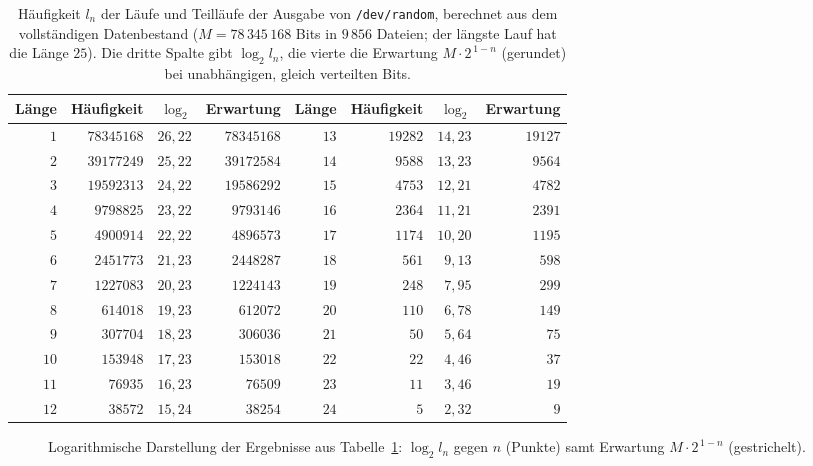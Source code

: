 \documentclass[11pt,a4paper]{scrartcl}
\theoremstyle{plain}
\theoremstyle{definition}
\theoremstyle{remark}
\begin{document}
\begin{table}[htbp]
\centering
\begin{tabular}{rrrrrrrr}
\toprule
Länge & Häufigkeit & $\log_2$ & Erwartung & Länge & Häufigkeit & $\log_2$ & Erwartung\\
\midrule
$1$&$78345168$&$26{,}22$&$78345168$&$13$&$19282$&$14{,}23$&$19127$\\
$2$&$39177249$&$25{,}22$&$39172584$&$14$&$9588$&$13{,}23$&$9564$\\
$3$&$19592313$&$24{,}22$&$19586292$&$15$&$4753$&$12{,}21$&$4782$\\
$4$&$9798825$&$23{,}22$&$9793146$&$16$&$2364$&$11{,}21$&$2391$\\
$5$&$4900914$&$22{,}22$&$4896573$&$17$&$1174$&$10{,}20$&$1195$\\
$6$&$2451773$&$21{,}23$&$2448287$&$18$&$561$&$9{,}13$&$598$\\
$7$&$1227083$&$20{,}23$&$1224143$&$19$&$248$&$7{,}95$&$299$\\
$8$&$614018$&$19{,}23$&$612072$&$20$&$110$&$6{,}78$&$149$\\
$9$&$307704$&$18{,}23$&$306036$&$21$&$50$&$5{,}64$&$75$\\
$10$&$153948$&$17{,}23$&$153018$&$22$&$22$&$4{,}46$&$37$\\
$11$&$76935$&$16{,}23$&$76509$&$23$&$11$&$3{,}46$&$19$\\
$12$&$38572$&$15{,}24$&$38254$&$24$&$5$&$2{,}32$&$9$\\
\bottomrule
\end{tabular}
\caption{Häufigkeit $l_n$ der Läufe und Teilläufe der Ausgabe von
\texttt{/dev/random}, berechnet aus dem vollständigen Datenbestand
($M=78\,345\,168$ Bits in $9\,856$ Dateien; der längste Lauf hat die
Länge $25$). Die dritte Spalte gibt $\log_2 l_n$, die vierte die
Erwartung $M\cdot 2^{\,1-n}$ (gerundet) bei unabhängigen, gleich
verteilten Bits.}
\label{tab:haeufigkeiten}
\end{table}

\begin{figure}[htbp]
\centering
{}
\caption{Logarithmische Darstellung der Ergebnisse aus
Tabelle~\ref{tab:haeufigkeiten}: $\log_2 l_n$ gegen $n$ (Punkte) samt
Erwartung $M\cdot 2^{\,1-n}$ (gestrichelt).}
\label{fig:haeufigkeiten}
\end{figure}
\end{document}
